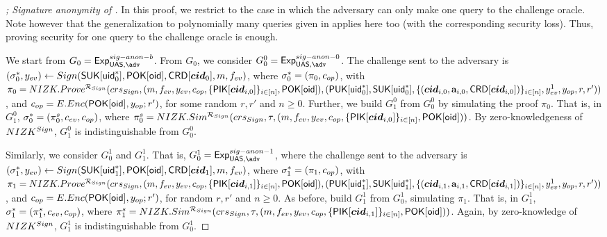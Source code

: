 \begin{proof}[; Signature anonymity of \CUASGen]

  In this proof, we restrict to the case in which the adversary can only make
  one query to the challenge oracle. Note however that the generalization to
  polynomially many queries given in \cite{bsz05} applies here too (with the
  corresponding security loss). Thus, proving security for one query to the
  challenge oracle is enough.

  We start from $G_0=\ExpSigAnonb$.  %
  From $G_0$, we consider $G^0_0 = \ExpSigAnonz$. The challenge sent to the
  adversary is $(\mathsf{\sigma}^*_0,y_{ev}) \gets Sign(\mathsf{S}\mathsf{UK}[\mathsf{uid}^*_0],\mathsf{P}\mathsf{OK}[\mathsf{oid}],
  \mathsf{CRD}[\boldsymbol{cid}_0],m,f_{ev})$, where $\mathsf{\sigma}^*_0 = (\pi_0,c_{op})$, with
  $\pi_0 = NIZK.Prove^{\mathcal{R}_{Sign}}(crs_{Sign},(m,f_{ev},y_{ev},
  c_{op},\lbrace\mathsf{P}\mathsf{IK}[\boldsymbol{cid}_{i,0}]\rbrace_{i\in[n]},\mathsf{P}\mathsf{OK}[\mathsf{oid}]),
  (\mathsf{P}\mathsf{UK}[\mathsf{uid}^*_0],\mathsf{S}\mathsf{UK}[\mathsf{uid}^*_0],\lbrace (\boldsymbol{cid}_{i,0},\mathbf{a}_{i,0},
  \mathsf{CRD}[\boldsymbol{cid}_{i,0}]) \rbrace_{i\in[n]},y_{ev}^1,y_{op},r,r'))$, and $c_{op} =
  E.Enc(\mathsf{P}\mathsf{OK}[\mathsf{oid}],y_{op};r')$, for some random $r,r'$ and $n \ge 0$.
  Further, we build $G_1^0$ from $G_0^0$ by simulating the proof $\pi_0$. That
  is, in $G_1^0$, $\mathsf{\sigma}^*_0 = (\pi_0^s,c_{ev},c_{op})$, where $\pi^s_0 =
  NIZK.Sim^{\mathcal{R}_{Sign}}(crs_{Sign},\tau,(m,f_{ev},y_{ev},
  c_{op},\lbrace\mathsf{P}\mathsf{IK}[\boldsymbol{cid}_{i,0}]\rbrace_{i\in[n]},\mathsf{P}\mathsf{OK}[\mathsf{oid}]))$. By
  zero-knowledgeness of $NIZK^{Sign}$, $G_1^0$ is indistinguishable from
  $G_0^0$.

  Similarly, we consider $G_0^1$ and $G_1^1$. That is, $G_0^1 = \ExpSigAnono$,
  where the challenge
  sent to the adversary is $(\mathsf{\sigma}^*_1,y_{ev}) \gets Sign(\mathsf{S}\mathsf{UK}[\mathsf{uid}^*_1],
  \mathsf{P}\mathsf{OK}[\mathsf{oid}],\mathsf{CRD}[\boldsymbol{cid}_1],m,f_{ev})$, where $\mathsf{\sigma}^*_1 = (\pi_1,
  c_{op})$, with $\pi_1 = NIZK.Prove^{\mathcal{R}_{Sign}}(crs_{Sign},
  (m,f_{ev},y_{ev},
  c_{op},\lbrace\mathsf{P}\mathsf{IK}[\boldsymbol{cid}_{i,1}]\rbrace_{i\in[n]},\mathsf{P}\mathsf{OK}[\mathsf{oid}]),
  (\mathsf{P}\mathsf{UK}[\mathsf{uid}^*_1],\mathsf{S}\mathsf{UK}[\mathsf{uid}^*_1],\lbrace (\boldsymbol{cid}_{i,1},\mathbf{a}_{i,1},
  \mathsf{CRD}[\boldsymbol{cid}_{i,1}]) \rbrace_{i\in[n]},y_{ev}^1,y_{op},r,r'))$, and
  $c_{op} = E.Enc(\mathsf{P}\mathsf{OK}[\mathsf{oid}],y_{op};r')$, for random $r,r'$ and $n \ge 0$. As
  before, build $G_1^1$ from $G_0^1$, simulating $\pi_1$. That is, in $G_1^1$,
  $\mathsf{\sigma}^*_1 = (\pi_1^s,c_{ev},c_{op})$, where $\pi^s_1 =
  NIZK.Sim^{\mathcal{R}_{Sign}}(crs_{Sign},\tau,(m,f_{ev},y_{ev},
  c_{op},\lbrace\mathsf{P}\mathsf{IK}[\boldsymbol{cid}_{i,1}]\rbrace_{i\in[n]},\mathsf{P}\mathsf{OK}[\mathsf{oid}]))$. Again, by
  zero-knowledge of $NIZK^{Sign}$, $G_1^1$ is
  indistinguishable from $G_0^1$.


\end{proof}
